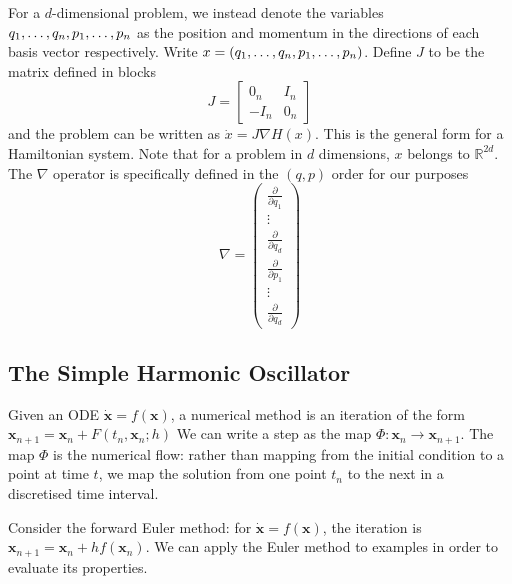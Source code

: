\documentclass{report}
\theoremstyle{exampstyle} \newtheorem{example}[theorem]{Example}
\theoremstyle{exampstyle} \newtheorem{remark}[theorem]{Remark}
\theoremstyle{exampstyle} \newtheorem{definition}[theorem]{Definition}
\theoremstyle{exampstyle} \newtheorem{lemma}[theorem]{Lemma}
\theoremstyle{exampstyle} \newtheorem{proposition}[theorem]{Proposition}
\begin{document}
For a $d$-dimensional problem,
we instead denote the variables $q_1, \mathellipsis, q_n, p_1, \mathellipsis, p_n$ as the position and momentum in the directions of each basis vector respectively.
Write $x = (q_1, \mathellipsis, q_n, p_1, \mathellipsis, p_n)$.
Define $J$ to be the matrix defined in blocks
\begin{equation}
	J = \begin{bmatrix}
		{0}_n & {I}_n \\
		-{I}_n & {0}_n
	\end{bmatrix}
\end{equation}
and the problem can be written as ${\dot{x}} = {J}\nabla H({x})$.
This is the general form for a Hamiltonian system.
Note that for a problem in $d$ dimensions,
$x$ belongs to $\mathds{R}^{2d}$.
The $\nabla$ operator is specifically defined in the $(q,p)$ order for our purposes
\begin{equation*}
	\nabla = \begin{pmatrix}
		\frac{\partial}{\partial q_1} \\
		\vdots \\
		\frac{\partial}{\partial q_d} \\
		\frac{\partial}{\partial p_1} \\
		\vdots \\
		\frac{\partial}{\partial q_d}
	\end{pmatrix}
\end{equation*}

\subsection{The Simple Harmonic Oscillator}

Given an ODE $\dot{\mathbf{x}} = f(\mathbf{x})$, a numerical method is an iteration of the form $\mathbf{x}_{n+1} = \mathbf{x}_n + F(t_n, \mathbf{x}_n; h)$
We can write a step as the map $\Phi: \mathbf{x}_n \rightarrow \mathbf{x}_{n+1}$. The map $\Phi$ is the numerical flow:
rather than mapping from the initial condition to a point at time $t$, we map the solution from one point $t_n$ to the next in a discretised time interval.

Consider the forward Euler method: for $\dot{\mathbf{x}} = f(\mathbf{x})$, the iteration is $\mathbf{x}_{n+1} = \mathbf{x}_n + hf(\mathbf{x}_n)$.
We can apply the Euler method to examples in order to evaluate its properties.
\end{document}
